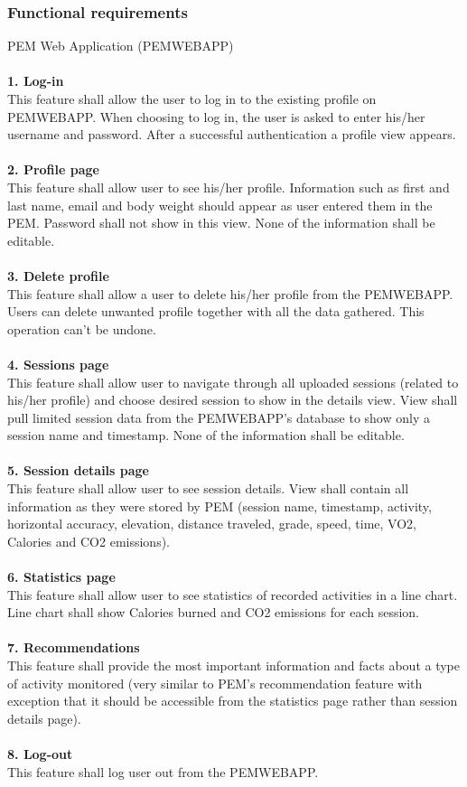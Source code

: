 \documentclass[12pt, a4paper]{report}   %
\begin{document}
\begin{enumerate}
\subsubsection{Functional requirements}
PEM Web Application (PEMWEBAPP)\\ \\
\textbf{1. Log-in}\\
This feature shall allow the user to log in to the existing profile on PEMWEBAPP. When choosing to log in, the user is asked to enter his/her username and password. After a successful authentication a profile view appears.\\ \\
\textbf{2. Profile page}\\
This feature shall allow user to see his/her profile. Information such as first and last name, email and body weight should appear as user entered them in the PEM. Password shall not show in this view. None of the information shall be editable.\\ \\
\textbf{3. Delete profile}\\
This feature shall allow a user to delete his/her profile from the PEMWEBAPP. Users can delete unwanted profile together with all the data gathered. This operation can't be undone.\\ \\
\textbf{4. Sessions page}\\
This feature shall allow user to navigate through all uploaded sessions (related to his/her profile) and choose desired session to show in the details view. View shall pull limited session data from the PEMWEBAPP's database to show only a session name and timestamp. None of the information shall be editable.\\ \\
\textbf{5. Session details page}\\
This feature shall allow user to see session details. View shall contain all information as they were stored by PEM (session name, timestamp, activity, horizontal accuracy, elevation, distance traveled, grade, speed, time, VO2, Calories and CO2 emissions).\\ \\
\textbf{6. Statistics page}\\
This feature shall allow user to see statistics of recorded activities in a line chart. Line chart shall show Calories burned and CO2 emissions for each session.\\ \\
\textbf{7. Recommendations}\\
This feature shall provide the most important information and facts about a type of activity monitored (very similar to PEM's recommendation feature with exception that it should be accessible from the statistics page rather than session details page).\\ \\
\textbf{8. Log-out}\\
This feature shall log user out from the PEMWEBAPP.\\ \\



\end{enumerate}
\end{document}
